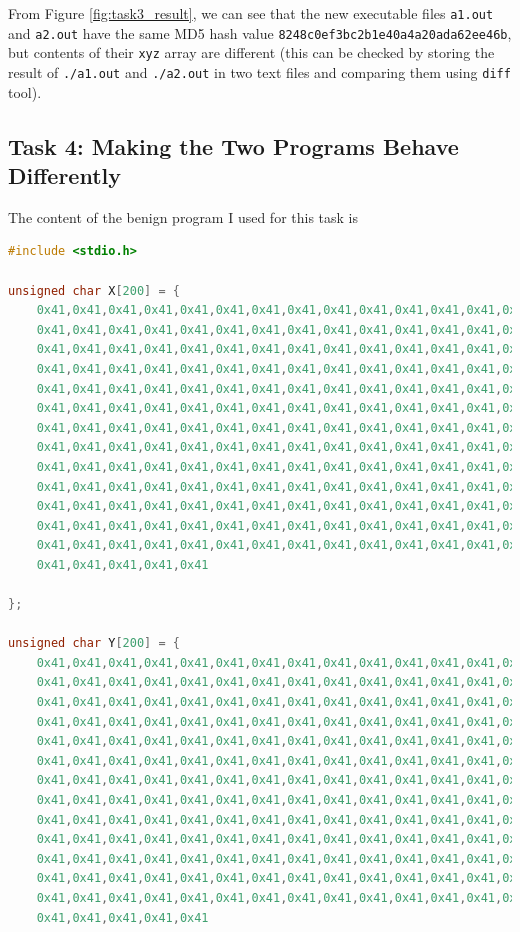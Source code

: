 \documentclass{article}
\begin{document}
From Figure \ref{fig:task3_result}, we can see that the new executable files
\texttt{a1.out} and \texttt{a2.out} have the same MD5 hash value
\texttt{8248c0ef3bc2b1e40a4a20ada62ee46b}, but contents of their \texttt{xyz}
array are different (this can be checked by storing the result of \texttt{./a1.out}
and \texttt{./a2.out} in two text files and comparing them using \texttt{diff} tool).

\subsection{Task 4: Making the Two Programs Behave Differently}

The content of the benign program I used for this task is

\begin{lstlisting}[language=c]
#include <stdio.h>

unsigned char X[200] = {
    0x41,0x41,0x41,0x41,0x41,0x41,0x41,0x41,0x41,0x41,0x41,0x41,0x41,0x41,0x41,
    0x41,0x41,0x41,0x41,0x41,0x41,0x41,0x41,0x41,0x41,0x41,0x41,0x41,0x41,0x41,
    0x41,0x41,0x41,0x41,0x41,0x41,0x41,0x41,0x41,0x41,0x41,0x41,0x41,0x41,0x41,
    0x41,0x41,0x41,0x41,0x41,0x41,0x41,0x41,0x41,0x41,0x41,0x41,0x41,0x41,0x41,
    0x41,0x41,0x41,0x41,0x41,0x41,0x41,0x41,0x41,0x41,0x41,0x41,0x41,0x41,0x41,
    0x41,0x41,0x41,0x41,0x41,0x41,0x41,0x41,0x41,0x41,0x41,0x41,0x41,0x41,0x41,
    0x41,0x41,0x41,0x41,0x41,0x41,0x41,0x41,0x41,0x41,0x41,0x41,0x41,0x41,0x41,
    0x41,0x41,0x41,0x41,0x41,0x41,0x41,0x41,0x41,0x41,0x41,0x41,0x41,0x41,0x41,
    0x41,0x41,0x41,0x41,0x41,0x41,0x41,0x41,0x41,0x41,0x41,0x41,0x41,0x41,0x41,
    0x41,0x41,0x41,0x41,0x41,0x41,0x41,0x41,0x41,0x41,0x41,0x41,0x41,0x41,0x41,
    0x41,0x41,0x41,0x41,0x41,0x41,0x41,0x41,0x41,0x41,0x41,0x41,0x41,0x41,0x41,
    0x41,0x41,0x41,0x41,0x41,0x41,0x41,0x41,0x41,0x41,0x41,0x41,0x41,0x41,0x41,
    0x41,0x41,0x41,0x41,0x41,0x41,0x41,0x41,0x41,0x41,0x41,0x41,0x41,0x41,0x41,
    0x41,0x41,0x41,0x41,0x41

};

unsigned char Y[200] = {
    0x41,0x41,0x41,0x41,0x41,0x41,0x41,0x41,0x41,0x41,0x41,0x41,0x41,0x41,0x41,
    0x41,0x41,0x41,0x41,0x41,0x41,0x41,0x41,0x41,0x41,0x41,0x41,0x41,0x41,0x41,
    0x41,0x41,0x41,0x41,0x41,0x41,0x41,0x41,0x41,0x41,0x41,0x41,0x41,0x41,0x41,
    0x41,0x41,0x41,0x41,0x41,0x41,0x41,0x41,0x41,0x41,0x41,0x41,0x41,0x41,0x41,
    0x41,0x41,0x41,0x41,0x41,0x41,0x41,0x41,0x41,0x41,0x41,0x41,0x41,0x41,0x41,
    0x41,0x41,0x41,0x41,0x41,0x41,0x41,0x41,0x41,0x41,0x41,0x41,0x41,0x41,0x41,
    0x41,0x41,0x41,0x41,0x41,0x41,0x41,0x41,0x41,0x41,0x41,0x41,0x41,0x41,0x41,
    0x41,0x41,0x41,0x41,0x41,0x41,0x41,0x41,0x41,0x41,0x41,0x41,0x41,0x41,0x41,
    0x41,0x41,0x41,0x41,0x41,0x41,0x41,0x41,0x41,0x41,0x41,0x41,0x41,0x41,0x41,
    0x41,0x41,0x41,0x41,0x41,0x41,0x41,0x41,0x41,0x41,0x41,0x41,0x41,0x41,0x41,
    0x41,0x41,0x41,0x41,0x41,0x41,0x41,0x41,0x41,0x41,0x41,0x41,0x41,0x41,0x41,
    0x41,0x41,0x41,0x41,0x41,0x41,0x41,0x41,0x41,0x41,0x41,0x41,0x41,0x41,0x41,
    0x41,0x41,0x41,0x41,0x41,0x41,0x41,0x41,0x41,0x41,0x41,0x41,0x41,0x41,0x41,
    0x41,0x41,0x41,0x41,0x41


\end{lstlisting}
\end{document}
